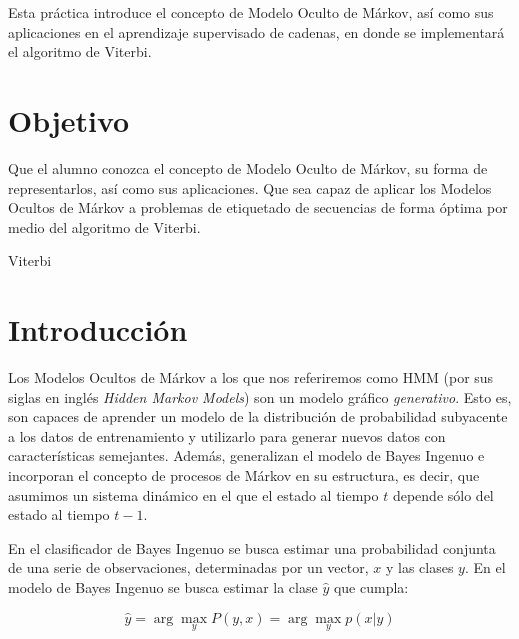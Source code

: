 
Esta práctica introduce el concepto de Modelo Oculto de Márkov, así como sus aplicaciones en el aprendizaje supervisado de cadenas, en donde se implementará el algoritmo de Viterbi.

\section{Objetivo}

Que el alumno conozca el concepto de Modelo Oculto de Márkov, su forma de representarlos, así como sus aplicaciones. Que sea capaz de aplicar los Modelos Ocultos de Márkov a problemas de etiquetado de secuencias de forma óptima por medio del algoritmo de Viterbi.


\begin{auxcode}
 \caption{Viterbi}
 \centering
\end{auxcode}


\section{Introducción}

Los Modelos Ocultos de Márkov a los que nos referiremos como HMM (por sus siglas en inglés \emph{Hidden Markov Models}) son un modelo gráfico \emph{generativo}.  Esto es, son capaces de aprender un modelo de la distribución de probabilidad subyacente a los datos de entrenamiento y utilizarlo para generar nuevos datos con características semejantes.  Además, generalizan el modelo de Bayes Ingenuo e incorporan el concepto de procesos de Márkov en su estructura, es decir, que asumimos un sistema dinámico en el que el estado al tiempo $t$ depende sólo del estado al tiempo $t-1$.

En el clasificador de Bayes Ingenuo se busca estimar una probabilidad conjunta de una serie de observaciones, determinadas por un vector, $x$ y las clases $y$. En el modelo de Bayes Ingenuo se busca estimar la clase $\hat{y}$ que cumpla:

$$ \hat{y} = \arg\max_y P(y,x) = \arg\max_y p(x|y)$$


